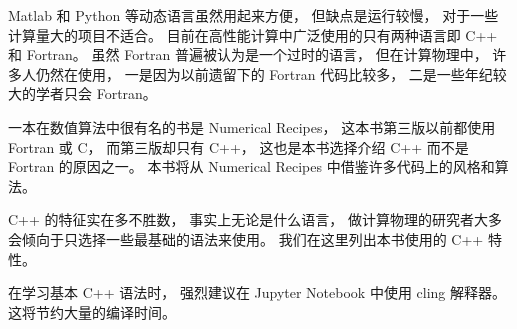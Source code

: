 
Matlab 和 Python 等动态语言虽然用起来方便， 但缺点是运行较慢， 对于一些计算量大的项目不适合。 目前在高性能计算中广泛使用的只有两种语言即 C++ 和 Fortran。 虽然 Fortran 普遍被认为是一个过时的语言， 但在计算物理中， 许多人仍然在使用， 一是因为以前遗留下的 Fortran 代码比较多， 二是一些年纪较大的学者只会 Fortran。

一本在数值算法中很有名的书是 Numerical Recipes， 这本书第三版以前都使用 Fortran 或 C， 而第三版却只有 C++， 这也是本书选择介绍 C++ 而不是 Fortran 的原因之一。 本书将从 Numerical Recipes 中借鉴许多代码上的风格和算法。

C++ 的特征实在多不胜数， 事实上无论是什么语言， 做计算物理的研究者大多会倾向于只选择一些最基础的语法来使用。
我们在这里列出本书使用的 C++ 特性。

在学习基本 C++ 语法时， 强烈建议在 Jupyter Notebook 中使用 cling 解释器。 这将节约大量的编译时间。


